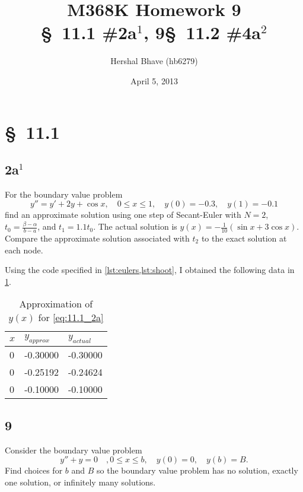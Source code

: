 \documentclass[12pt]{article}
\title{M368K Homework 9 \\
  \normalsize{\S~11.1 \#2a$^1$, 9\quad \S~11.2 \#4a$^2$}}
\author{Hershal Bhave (hb6279)}
\date{April 5, 2013}
\begin{document}
\maketitle

\section{\S~11.1}
\subsection{2a$^1$}
For the boundary value problem 
\begin{equation}
  \label{eq:11.1_2a}
  y''=y'+2y+\cos x,\quad 0\leq x \leq 1,\quad y(0)=-0.3,\quad y(1)=-0.1
\end{equation}
find an approximate solution using one step of Secant-Euler with
$N=2$, $t_0=\frac{\beta-\alpha}{b-a}$, and $t_1=1.1t_0$. The actual
solution is $y(x)=-\frac{1}{10}(\sin x + 3\cos x)$. Compare the
approximate solution associated with $t_2$ to the exact solution at
each node.

Using the code specified in \cref{lst:eulers,lst:shoot}, I obtained the following
data in \cref{tab:2a_data}.

\begin{table}[h]
  \centering
  \begin{tabularx}{.5\textwidth}{XXX}
    \hline
    $x$ & $y_{approx}$ & $y_{actual}$ \\
    \hline
    0 &    -0.30000 &     -0.30000 \\
    0 &    -0.25192 &     -0.24624 \\
    0 &    -0.10000 &     -0.10000 \\
    \hline           
  \end{tabularx}
  \caption{Approximation of $y(x)$ for \cref{eq:11.1_2a}}
  \label{tab:2a_data}
\end{table}

\subsection{9}
Consider the boundary value problem 
\begin{equation}
  \label{eq:11.1_9}
  y''+y=0\quad, 0\leq x\leq b,\quad y(0)=0,\quad y(b)=B.
\end{equation}
Find choices for $b$ and $B$ so the boundary value problem has no solution, exactly one solution, or infinitely many solutions.
\end{document}
